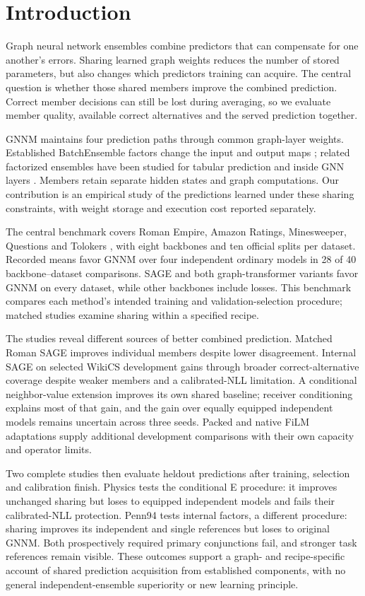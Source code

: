 \section{Introduction}
Graph neural network ensembles combine predictors that can compensate for one another's errors. Sharing learned graph weights reduces the number of stored parameters, but also changes which predictors training can acquire. The central question is whether those shared members improve the combined prediction. Correct member decisions can still be lost during averaging, so we evaluate member quality, available correct alternatives and the served prediction together.

GNNM maintains four prediction paths through common graph-layer weights. Established BatchEnsemble factors change the input and output maps \citep{wen2020batchensemble}; related factorized ensembles have been studied for tabular prediction \citep{gorishniy2025tabm} and inside GNN layers \citep{kim2023efficient}. Members retain separate hidden states and graph computations. Our contribution is an empirical study of the predictions learned under these sharing constraints, with weight storage and execution cost reported separately.

The central benchmark covers Roman Empire, Amazon Ratings, Minesweeper, Questions and Tolokers \citep{platonov2023critical}, with eight backbones and ten official splits per dataset. Recorded means favor GNNM over four independent ordinary models in 28 of 40 backbone--dataset comparisons. SAGE and both graph-transformer variants favor GNNM on every dataset, while other backbones include losses. This benchmark compares each method's intended training and validation-selection procedure; matched studies examine sharing within a specified recipe.

The studies reveal different sources of better combined prediction. Matched Roman SAGE improves individual members despite lower disagreement. Internal SAGE on selected WikiCS development gains through broader correct-alternative coverage despite weaker members and a calibrated-NLL limitation. A conditional neighbor-value extension improves its own shared baseline; receiver conditioning explains most of that gain, and the gain over equally equipped independent models remains uncertain across three seeds. Packed and native FiLM adaptations supply additional development comparisons with their own capacity and operator limits.

Two complete studies then evaluate heldout predictions after training, selection and calibration finish. Physics tests the conditional E procedure: it improves unchanged sharing but loses to equipped independent models and fails their calibrated-NLL protection. Penn94 tests internal factors, a different procedure: sharing improves its independent and single references but loses to original GNNM. Both prospectively required primary conjunctions fail, and stronger task references remain visible. These outcomes support a graph- and recipe-specific account of shared prediction acquisition from established components, with no general independent-ensemble superiority or new learning principle.
